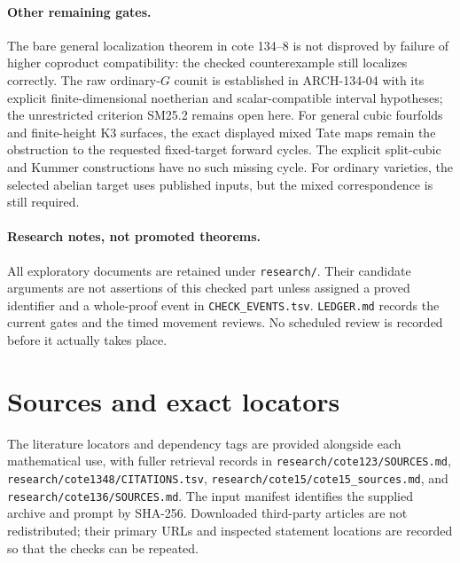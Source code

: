 \documentclass[11pt,a4paper]{article}
\begin{document}
\paragraph{Other remaining gates.}
The bare general localization theorem in cote 134--8 is not disproved
by failure of higher coproduct compatibility: the checked counterexample
still localizes correctly. The raw ordinary-$G$ counit is established
in ARCH-134-04 with its explicit finite-dimensional noetherian and
scalar-compatible interval hypotheses; the unrestricted criterion
SM25.2 remains open here. For general cubic fourfolds and finite-height
K3 surfaces, the exact displayed mixed Tate maps remain the obstruction
to the requested fixed-target forward cycles. The explicit split-cubic
and Kummer constructions have no such missing cycle. For ordinary
varieties, the selected abelian target uses published inputs, but the
mixed correspondence is still required.

\paragraph{Research notes, not promoted theorems.}
All exploratory documents are retained under \texttt{research/}.
Their candidate arguments are not assertions of this checked part
unless assigned a proved identifier and a whole-proof event in
\texttt{CHECK\_EVENTS.tsv}. \texttt{LEDGER.md} records the current gates
and the timed movement reviews. No scheduled review is recorded before
it actually takes place.

\section{Sources and exact locators}
The literature locators and dependency tags are provided alongside
each mathematical use, with fuller retrieval records in
\nolinkurl{research/cote123/SOURCES.md},
\nolinkurl{research/cote1348/CITATIONS.tsv},
\texttt{research/cote15/cote15\_sources.md}, and
\texttt{research/cote136/SOURCES.md}. The input manifest identifies the
supplied archive and prompt by SHA-256. Downloaded third-party articles
are not redistributed; their primary URLs and inspected statement
locations are recorded so that the checks can be repeated.
\end{document}
